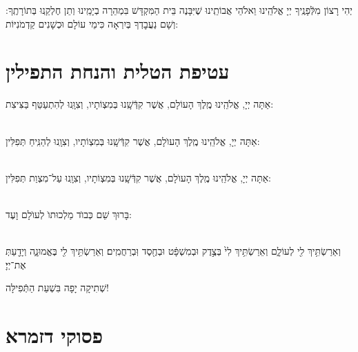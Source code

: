\documentclass[twoside, openany, parskip=half, 11pt]{book}
\begin{document}
יְהִי רָצוֹן מִלְּֿפָנֶֽיךָ יְיָ אֱלֹהֵֽינוּ וֵאלֹהֵי אֲבוֹתֵֽינוּ שֶׁיִּבָּנֶה בֵּית הַמִּקְדָּשׁ בִּמְהֵרָה בְיָמֵֽינוּ וְתֵן חֶלְקֵֽנוּ בְּתוֹרָתֶֽךָ: וְשָׁם נַעֲבׇדְךָ בְּיִרְאָה כִּימֵי עוֹלָם וּכְשָׁנִים קַדְמֹנִיּוֹת:

\clearpage

\section[עטיפת הטלית והנחת התפילין]{ עטיפת הטלית והנחת התפילין }

 אַתָּה יְיָ, אֱלֹהֵֽינוּ מֶֽלֶךְ הָעוֹלָם, אֲשֶׁר קִדְּֿשָֽׁנוּ בְּמִצְוֹתָיו, וְצִוָּֽנוּ לְהִתְעַטֵּף בַּצִּיצִת:


\sepline

\\
 אַתָּה יְיָ, אֱלֹהֵֽינוּ מֶֽלֶךְ הָעוֺלָם, אֲשֶׁר קִדְּֿשָֽׁנוּ בְּמִצְוֹתָיו, וְצִוָֽנוּ לְהַנִּֽיחַ תְּפִלִּין:

\\
 אַתָּה יְיָ, אֱלֹהֵֽינוּ מֶֽלֶךְ הָעוֺלָם, אֲשֶׁר קִדְּֿשָֽׁנוּ בְּמִצְוֹתָיו, וְצִוָֽנוּ עַל־מִצְוַת תְּפִלִּין:

\\
בָּרוּךְ שֵׁם כְּבוֺד מַלְכוּתוֺ לְעוֺלָם וָעֶד:


\\
וְאֵרַשְׂתִּ֥יךְ  לִ֖י לְעוֹלָ֑ם וְאֵרַשְׂתִּ֥יךְ לִי֙ בְּצֶ֣דֶק וּבְמִשְׁפָּ֔ט וּבְחֶ֖סֶד וּֽבְרַחֲמִֽים׃ וְאֵרַשְׂתִּ֥יךְ לִ֖י בֶּאֱמוּנָ֑ה וְיָדַ֖עַתְּ אֶת־יְיָ׃ 


\vfill

\begin{Large}
שְׁתִיקָה יָפָה בִּשְׁעַת הַתְּֿפִילָּה!
\end{Large}



\section[שחרית לחול]{ פסוקי דזמרא }

\end{document}
